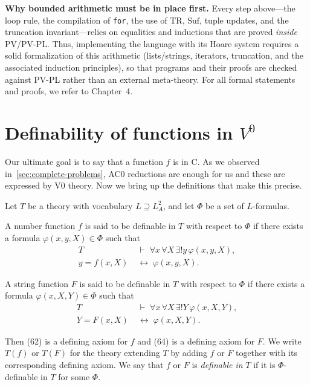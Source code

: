 \medskip
\noindent\textbf{Why bounded arithmetic must be in place first.}
Every step above---the loop rule, the compilation of \texttt{for}, the use of \(\mathrm{TR}\), \(\mathrm{Suf}\), tuple updates, and the truncation invariant---relies on equalities and inductions that are proved \emph{inside} PV/PV-PL.\@
Thus, implementing the language with its Hoare system requires a solid formalization of this arithmetic (lists/strings, iterators, truncation, and the associated induction principles), so that programs and their proofs are checked against PV-PL rather than an external meta-theory.
For all formal statements and proofs, we refer to Chapter~4.

\section{Definability of functions in \texorpdfstring{$V^0$}{V0}}
Our ultimate goal is to say that a function $f$ is in C.
As we observed in~\ref{sec:complete-problems}, AC0 reductions are enough for us
and these are expressed by V0 theory. Now we bring up the definitions that make this precise.

\begin{definition}
Let \(T\) be a theory with vocabulary \(L \supseteq L^2_A\), and let \(\Phi\) be a set of \(L\)-formulas.

\medskip
A number function \(f\) is said to be definable in \(T\) with respect to \(\Phi\) if there exists a formula
\(\varphi(x, y, X) \in \Phi\) such that
\begin{align}
T &\;\vdash\; \forall x \, \forall X \, \exists! y \, \varphi(x, y, X), \tag{61} \\[4pt]
y = f(x, X) &\;\leftrightarrow\; \varphi(x, y, X). \tag{62}
\end{align}

\medskip
A string function \(F\) is said to be definable in \(T\) with respect to \(\Phi\) if there exists a formula
\(\varphi(x, X, Y) \in \Phi\) such that
\begin{align}
T &\;\vdash\; \forall x \, \forall X \, \exists! Y \, \varphi(x, X, Y), \tag{63} \\[4pt]
Y = F(x, X) &\;\leftrightarrow\; \varphi(x, X, Y). \tag{64}
\end{align}

\medskip
Then \textup{(62)} is a defining axiom for \(f\) and \textup{(64)} is a defining axiom for \(F\).
We write \(T(f)\) or \(T(F)\) for the theory extending \(T\) by adding \(f\) or \(F\)
together with its corresponding defining axiom.
We say that \(f\) or \(F\) is \textit{definable in} \(T\) if it is \(\Phi\)-definable in \(T\)
for some \(\Phi\).
\end{definition}


